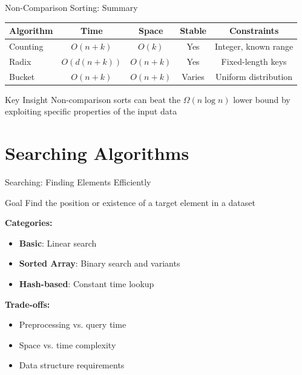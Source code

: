 \documentclass[aspectratio=169,xcolor=dvipsnames]{beamer}
\begin{document}
\begin{frame}{Non-Comparison Sorting: Summary}
  \begin{table}
    \centering
    \small
    \begin{tabular}{lcccc}
      \hline
      \textbf{Algorithm} & \textbf{Time} & \textbf{Space} & \textbf{Stable} & \textbf{Constraints} \\
      \hline
      Counting & $O(n + k)$ & $O(k)$ & Yes & Integer, known range \\
      Radix & $O(d(n + k))$ & $O(n + k)$ & Yes & Fixed-length keys \\
      Bucket & $O(n + k)$ & $O(n + k)$ & Varies & Uniform distribution \\
      \hline
    \end{tabular}
  \end{table}

  \vspace{0.3cm}
  \begin{block}{Key Insight}
    Non-comparison sorts can beat the $\Omega(n \log n)$ lower bound by exploiting specific properties of the input data
  \end{block}
\end{frame}

\section{Searching Algorithms}

\begin{frame}{Searching: Finding Elements Efficiently}
  \begin{block}{Goal}
    Find the position or existence of a target element in a dataset
  \end{block}

  \vspace{0.3cm}
  \textbf{Categories:}
  \begin{itemize}
    \item \textbf{Basic}: Linear search
    \item \textbf{Sorted Array}: Binary search and variants
    \item \textbf{Hash-based}: Constant time lookup
  \end{itemize}

  \vspace{0.3cm}
  \textbf{Trade-offs:}
  \begin{itemize}
    \item Preprocessing vs. query time
    \item Space vs. time complexity
    \item Data structure requirements
  \end{itemize}
\end{frame}
\end{document}

